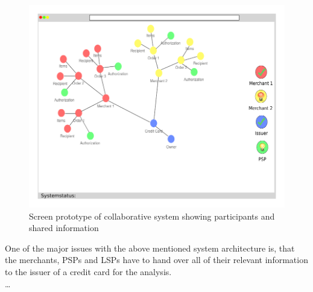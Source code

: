 \begin{figure}[H]
	\centering
		\includegraphics[width=0.9\columnwidth]{images/p2p_initial_screen.pdf}
	\caption{Screen prototype of collaborative system showing participants and shared information}
\label{fig:images_p2p_initial_screen}
\end{figure}

One of the major issues with the above mentioned system architecture is, that the merchants, \gls{PSP}s and \gls{LSP}s have to hand over all of their relevant information to the issuer of a credit card for the analysis. \\

\ldots


